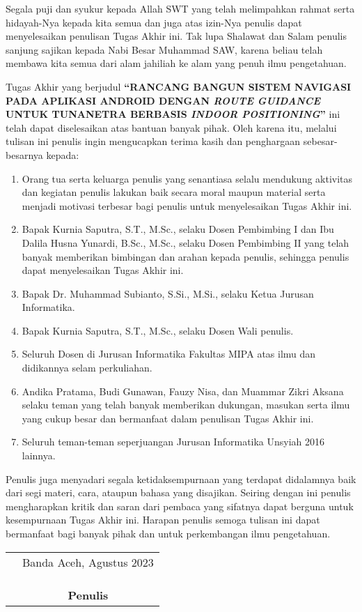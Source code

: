 \preface %


Segala puji dan syukur kepada Allah SWT yang telah melimpahkan rahmat serta hidayah-Nya kepada kita semua dan juga atas izin-Nya penulis dapat menyelesaikan penulisan Tugas Akhir ini. Tak lupa Shalawat dan Salam penulis sanjung sajikan kepada Nabi Besar Muhammad SAW, karena beliau telah membawa kita semua dari alam jahiliah ke alam yang penuh ilmu pengetahuan.

Tugas Akhir yang berjudul \textbf{“RANCANG BANGUN SISTEM NAVIGASI PADA APLIKASI ANDROID DENGAN \textit{ROUTE GUIDANCE} UNTUK TUNANETRA BERBASIS \textit{INDOOR POSITIONING}”} ini telah dapat diselesaikan atas bantuan banyak pihak. Oleh karena itu, melalui tulisan ini penulis ingin mengucapkan terima kasih dan penghargaan sebesar-besarnya kepada:

\begin{enumerate}
	\item {Orang tua serta keluarga penulis yang senantiasa selalu mendukung aktivitas dan kegiatan penulis lakukan baik secara moral maupun material serta menjadi motivasi terbesar bagi penulis untuk menyelesaikan Tugas Akhir ini.}
	\item {Bapak Kurnia Saputra, S.T., M.Sc., selaku Dosen Pembimbing I dan Ibu Dalila Husna Yunardi, B.Sc., M.Sc., selaku Dosen Pembimbing II yang telah banyak memberikan bimbingan dan arahan kepada penulis, sehingga penulis dapat menyelesaikan Tugas Akhir ini.}
	\item {Bapak Dr. Muhammad Subianto, S.Si., M.Si., selaku Ketua Jurusan Informatika.}
	\item {Bapak Kurnia Saputra, S.T., M.Sc., selaku Dosen Wali penulis.}
	\item {Seluruh Dosen di Jurusan Informatika Fakultas MIPA atas ilmu dan didikannya selam perkuliahan.}
	\item {Andika Pratama, Budi Gunawan, Fauzy Nisa, dan Muammar Zikri Aksana selaku teman yang telah banyak memberikan dukungan, masukan serta ilmu yang cukup besar dan bermanfaat dalam penulisan Tugas Akhir ini. }
	\item{Seluruh teman-teman seperjuangan Jurusan Informatika Unsyiah 2016 lainnya.}
\end{enumerate}


Penulis juga menyadari segala ketidaksempurnaan yang terdapat didalamnya baik dari segi materi, cara, ataupun bahasa yang disajikan. Seiring dengan ini penulis mengharapkan kritik dan saran dari pembaca yang sifatnya dapat berguna untuk kesempurnaan Tugas Akhir ini. Harapan penulis semoga tulisan ini dapat bermanfaat bagi banyak pihak dan untuk perkembangan ilmu pengetahuan.

\vspace{1cm}


\begin{tabular}{p{7.5cm}c}
	&Banda Aceh, Agustus 2023\\
	&\\
	&\\
	&\\
	&\textbf{Penulis}
\end{tabular}